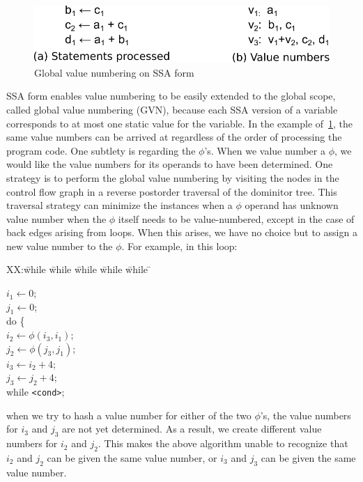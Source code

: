 \begin{figure}[t]
\centering
\includegraphics[scale=0.55]{fig-glob-value-num.pdf}
\caption{Global value numbering on SSA form}
\label{fig: glob-value-num}
\end{figure}

SSA form enables value numbering to be easily extended to the global scope,
called global value numbering (GVN), because each SSA version of a variable
corresponds to at most one static value for the variable.  In the example
of~\ref{fig: glob-value-num}, the same value numbers can be arrived at
regardless of the order of processing the program code.  One subtlety is
regarding the $\phi$'s.  When we value number a $\phi$, we would like the
value numbers for its operands to have been determined.  One strategy is to
perform the global value numbering by visiting the nodes in the control
flow graph in a reverse postorder traversal of the dominitor tree.
This traversal strategy can minimize the instances when a $\phi$ operand has 
unknown value number when the $\phi$ itself needs to be value-numbered,
except in the case of back edges arising from loops.  When this arises,
we have no choice but to assign a new value number to the $\phi$.
For example, in this loop:
\begin{tabbing}
XX:\= while \= while \= while \= while \= while \= \kill

\> \> $i_1 \leftarrow 0$; \\
\> \> $j_1 \leftarrow 0$; \\
\> \> do \{ \\
\> \> \> $i_2 \leftarrow \phi(i_3, i_1)$; \\
\> \> \> $j_2 \leftarrow \phi(j_3, j_1)$; \\
\> \> \> $i_3 \leftarrow i_2 + 4$; \\
\> \> \> $j_3 \leftarrow j_2 + 4$; \\
\> \> while \texttt{<cond>}; \\
\end{tabbing}
when we try to hash a value number for either of the two $\phi$'s, the value
numbers for $i_3$ and $j_3$ are not yet determined.  As a result, we create
different value numbers for $i_2$ and $j_2$.  This makes the above algorithm
unable to recognize that $i_2$ and $j_2$ can be given the same value number,
or $i_3$ and $j_3$ can be given the same value number.

